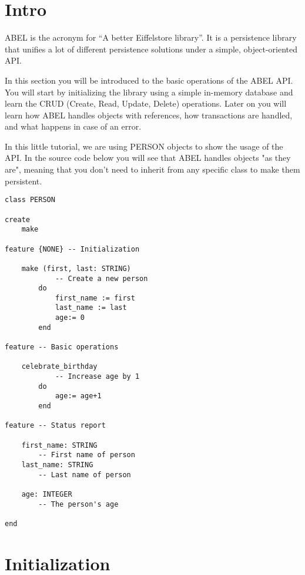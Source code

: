 
\section{Intro}

ABEL is the acronym for ``A better Eiffelstore library''.
It is a persistence library that unifies a lot of different persistence solutions under a simple, object-oriented API.

In this section you will be introduced to the basic operations of the ABEL API. 
You will start by initializing the library using a simple in-memory database and learn the CRUD (Create, Read, Update, Delete) operations.
Later on you will learn how ABEL handles objects with references, how transactions are handled, and what happens in case of an error.

In this little tutorial, we are using PERSON objects to show the usage of the API.
In the source code below you will see that ABEL handles objects "as they are", meaning that you don't need to inherit from any specific class to make them persistent.

\begin{lstlisting}[language=OOSC2Eiffel, captionpos=b, caption={The PERSON class}, label={lst:person_class}]
class PERSON

create
	make

feature {NONE} -- Initialization

	make (first, last: STRING)
			-- Create a new person
		do
			first_name := first
			last_name := last
			age:= 0
		end

feature -- Basic operations

	celebrate_birthday
			-- Increase age by 1
		do
			age:= age+1
		end

feature -- Status report

	first_name: STRING
		-- First name of person
	last_name: STRING
		-- Last name of person

	age: INTEGER
		-- The person's age

end

\end{lstlisting}



\section{Initialization}

